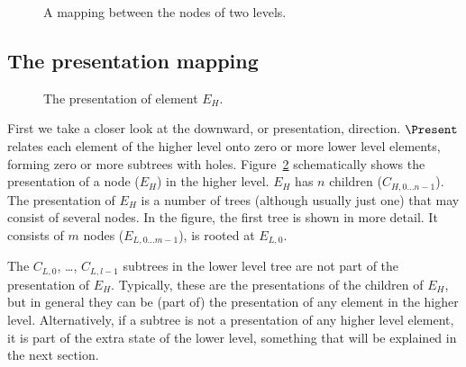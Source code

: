 \begin{figure}
\begin{center}
\begin{center}
\end{center}
\caption{A mapping between the nodes of two levels.}\label{nodeMapping} 
\end{center}
\end{figure}



%																
\subsection{The presentation mapping}

\begin{figure}
\begin{center}
\begin{center}
%                    
\end{center}
\caption{The presentation of element $E_H$.}\label{elementPresentation} 
\end{center}
\end{figure}

First we take a closer look at the downward, or presentation, direction. $\Present$ relates each element of the higher level onto zero or more lower level elements, forming zero or more subtrees with holes.  Figure~\ref{elementPresentation} schematically shows the presentation of a node ($E_H$) in the higher level. $E_H$ has $n$ children ($C_{H,0\dots n-1}$). The presentation of $E_H$ is a number of trees (although usually just one) that may consist of several nodes. In the figure, the first tree is shown in more detail. It consists of $m$ nodes ($E_{L,0\dots m-1}$), is rooted at $E_{L,0}$. 

The $C_{L,0}$, \dots, $C_{L,l-1}$ subtrees in the lower level tree are not part of the presentation of $E_H$. Typically, these are the presentations of the children of $E_H$, but in general they can be (part of) the presentation of any element in the higher level. Alternatively, if a subtree is not a presentation of any higher level element, it is part of the extra state of the lower level, something that will be explained in the next section.

